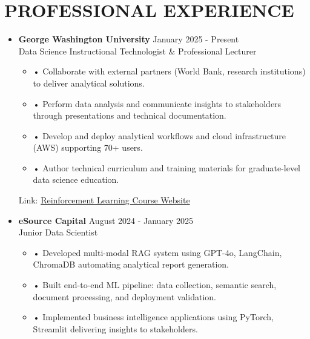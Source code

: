 \documentclass[a4paper,9pt]{extarticle}
\begin{document}

\section*{PROFESSIONAL EXPERIENCE}

\begin{itemize}[leftmargin=0.4cm, label={}]
    \item \textbf{George Washington University} \hfill January 2025 - Present \\
    Data Science Instructional Technologist \& Professional Lecturer
    \vspace{-0.1cm}
    \begin{itemize}[leftmargin=0.3cm, label={}]
    \item \small{•} \normalsize{Collaborate with external partners (World Bank, research institutions) to deliver analytical solutions.}
    \item \small{•} \normalsize{Perform data analysis and communicate insights to stakeholders through presentations and technical documentation.}
    \item \small{•} \normalsize{Develop and deploy analytical workflows and cloud infrastructure (AWS) supporting 70+ users.}
    \item \small{•} \normalsize{Author technical curriculum and training materials for graduate-level data science education.}
    \end{itemize}
    Link: \href{https://twallett.com/courses/reinforcement-learning/}{Reinforcement Learning Course Website}
\end{itemize}

\noindent
\begin{itemize}[leftmargin=0.4cm, label={}]
    \item \textbf{eSource Capital} \hfill August 2024 - January 2025 \\
    Junior Data Scientist 
    \vspace{-0.1cm}
    \begin{itemize}[leftmargin=0.3cm, label={}]
\item \small{•} \normalsize{Developed multi-modal RAG system using GPT-4o, LangChain, ChromaDB automating analytical report generation.}
    \item \small{•} \normalsize{Built end-to-end ML pipeline: data collection, semantic search, document processing, and deployment validation.}
    \item \small{•} \normalsize{Implemented business intelligence applications using PyTorch, Streamlit delivering insights to stakeholders.}
    \end{itemize}
\end{itemize}
\end{document}
